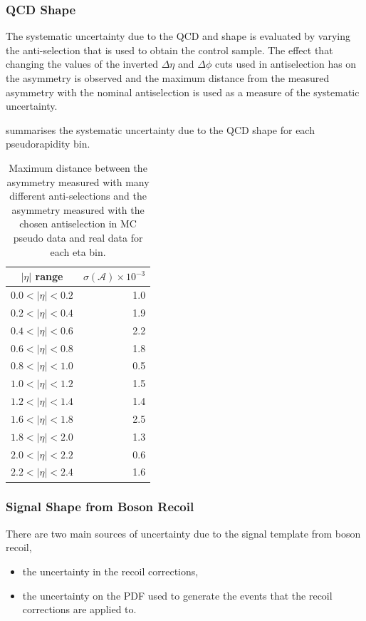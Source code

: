 \subsubsection{QCD \ETm Shape}
The systematic uncertainty due to the {QCD} and \gjet \ETm shape is evaluated
by varying the anti-selection that is used to obtain the control sample. The
effect that changing the values of the inverted $\Delta\eta$ and $\Delta\phi$
cuts used in antiselection has on the asymmetry is observed and the maximum
distance from the measured asymmetry with the nominal antiselection is used as a
measure of the systematic uncertainty.

 summarises the systematic uncertainty due to the
{QCD} \ETm shape for each pseudorapidity bin.

\begin{table}[htbp]
\begin{center}
\begin{tabular}{cr}
\toprule
$|\eta|$ range  & $\sigma(\mathcal{A}) \times 10^{-3}$\\
\midrule
$0.0<|\eta|<0.2$ & 1.0\\
$0.2<|\eta|<0.4$ & 1.9\\
$0.4<|\eta|<0.6$ & 2.2\\
$0.6<|\eta|<0.8$ & 1.8\\
$0.8<|\eta|<1.0$ & 0.5\\
$1.0<|\eta|<1.2$ & 1.5\\
$1.2<|\eta|<1.4$ & 1.4\\
$1.6<|\eta|<1.8$ & 2.5\\
$1.8<|\eta|<2.0$ & 1.3\\
$2.0<|\eta|<2.2$ & 0.6\\
$2.2<|\eta|<2.4$ & 1.6\\
\bottomrule
\end{tabular}
\caption{Maximum distance between the asymmetry measured with many different anti-selections
and the asymmetry measured with the chosen antiselection in MC pseudo data and real data for each eta bin\cite{bendavid2011electron}.}
\label{tab:updatedsystQCD}
\end{center}
\end{table}

\subsubsection{Signal \ETm Shape from Boson Recoil}

There are two main sources of uncertainty due to the signal template from
boson recoil,
\begin{itemize}
    \item the uncertainty in the recoil corrections,
    \item the uncertainty on the {PDF} used to generate the events that the
recoil corrections are applied to.
\end{itemize}

